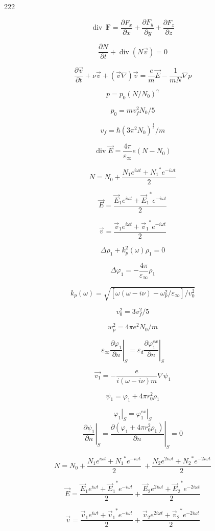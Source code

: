 \documentclass{article}
\begin{document}
\def \eps {\varepsilon}
\def \w {\omega}
\def \ph {\varphi}
\def \kp { \varkappa}
\newcommand{\dt}[1]{\frac{\partial {#1}}{\partial t}}
\newcommand{\dn}[1]{\left.\frac{\partial #1}{\partial n}\right|_{ S}}
\newcommand{\dr}[1]{\left.\frac{\partial #1}{\partial r}\right|_{ r = a}}
\newcommand{\sumexp}[1]{\frac{{#1} e^{i \w t} + {#1}^* e^{-i \w t}}{2}}
\newcommand{\sumexptwo}[1]{\frac{{#1} e^{2 i \w t} + {#1}^* e^{-2 i \w t}}{2}}

222

\[ \operatorname{div}\,\mathbf{F} =\frac{\partial F_x}{\partial x} +\frac{\partial F_y}{\partial y} +\frac{\partial F_z}{\partial z}\]

\[ \dt{N} + \operatorname{div}(N \vec{v}) = 0 \]

\[ \dt{\vec{v}} + \nu \vec{v} +(\vec{v} \nabla)\vec{v} = \frac{e}{m}\vec{E} - \frac{1}{mN} \nabla p\]

\[ p = p_0 (N/N_0)^\gamma\]

\[ p_0 = m v_f^2 N_0/5\]

\[ v_f = \hbar (3 \pi^2 N_0)^\frac{1}{3}/m\]

\[ \operatorname{div} \vec{E} = \frac{4 \pi}{\eps_\infty}e(N-N_0)\]

\[ N = N_0 + \sumexp{N_1} \]

\[ \vec{E} = \sumexp{\vec{E}_1}\]

\[ \vec{v} = \sumexp{\vec{v}_1}\]

\[ \Delta \rho_1 + k_p^2(\w)\rho_1 = 0\]

\[ \Delta \ph_1 = - \frac{4 \pi}{\eps_\infty} \rho_1 \]

\[  k_p(\w) = \sqrt{[\w(\w - i\nu) - \w_p^2/\eps_\infty]/v_0^2} \]

\[ v_0^2 = 3 v_f^2 / 5\]

\[ w_p^2 = 4 \pi e^2 N_0 / m\]

\[ \eps_\infty \dn{\ph_1} = \eps_d \dn{\ph_1^{ex}}  \]

\[ \vec{v_1} = - \frac{e}{i(\w - i \nu)m}\nabla \psi_1\]

\[ \psi_1 = \ph_1 + 4 \pi r_0^2 \rho_1\]

\[ \left. \ph_1 \right|_{ S} = \left. \ph_1^{ex} \right|_{ S} \]
\[ \dn{\psi_1} = \dn{(\ph_1 + 4 \pi r_0^2 \rho_1)} = 0 \]

\[ N = N_0 + \sumexp{N_1} \ + \sumexptwo{N_2} \]

\[ \vec{E} =\sumexp{\vec{E}_1} + \sumexptwo{\vec{E}_2}\]

\[ \vec{v} =\sumexp{\vec{v}_1} + \sumexptwo{\vec{v}_2}\]
\end{document}
